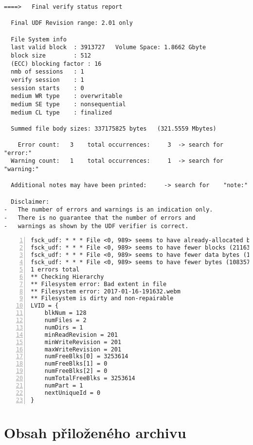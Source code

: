 \begin{lstlisting}
====>   Final verify status report

  Final UDF Revision range: 2.01 only

  File System info
  last valid block  : 3913727   Volume Space: 1.8662 Gbyte
  block size        : 512
  (ECC) blocking factor : 16
  nmb of sessions   : 1
  verify session    : 1
  session starts    : 0       
  medium WR type    : overwritable
  medium SE type    : nonsequential
  medium CL type    : finalized

  Summed file body sizes: 337175825 bytes   (321.5559 Mbytes)

    Error count:   3    total occurrences:     3  -> search for   "error:"
  Warning count:   1    total occurrences:     1  -> search for "warning:"

  Additional notes may have been printed:     -> search for    "note:"

  Disclaimer:
-   The number of errors and warnings is an indication only.
-   There is no guarantee that the number of errors and
-   warnings as shown by the UDF verifier is correct.
\end{lstlisting}
\pagebreak
\begin{lstlisting}[frame=single,caption={Výsledek kontroly poškozeného média programem \texttt{fsck\_udf}},label=lst:fsck-udf-mac,basicstyle=\ttfamily\scriptsize, keywordstyle=\color{black}\bfseries\underbar,nolol,numbers=left,texcl=false]
fsck_udf: * * * File <0, 989> seems to have already-allocated blocks! * * *
fsck_udf: * * * File <0, 989> seems to have fewer blocks (2116354) than expected (19202) * * *
fsck_udf: * * * File <0, 989> seems to have fewer data bytes (1083573248) than expected (9830400) * * *
fsck_udf: * * * File <0, 989> seems to have fewer bytes (1083573248) than expected (9830400) * * *
1 errors total
** Checking Hierarchy
** Filesystem error: Bad extent in file
** Filesystem error: 2017-01-16-191632.webm
** Filesystem is dirty and non-repairable
LVID = {
    blkNum = 128
    numFiles = 2
    numDirs = 1
    minReadRevision = 201
    minWriteRevision = 201
    maxWriteRevision = 201
    numFreeBlks[0] = 3253614
    numFreeBlks[1] = 0
    numFreeBlks[2] = 0
    numTotalFreeBlks = 3253614
    numPart = 1
    nextUniqueId = 0
}
\end{lstlisting}

\chapter{Obsah přiloženého archivu}

